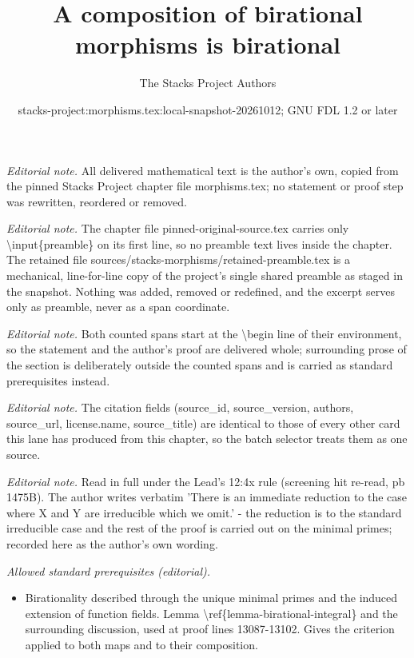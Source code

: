 \documentclass[10pt,a4paper]{amsart}
\title{A composition of birational morphisms is birational}
\author{The Stacks Project Authors}
\date{stacks-project:morphisms.tex:local-snapshot-20261012; GNU FDL 1.2 or later}
\theoremstyle{plain}
\theoremstyle{definition}
\theoremstyle{remark}
\numberwithin{equation}{subsection}
\begin{document}
\maketitle
\setcounter{subsection}{1}
\noindent\textit{Editorial note.} All delivered mathematical text is the author's own, copied from the pinned Stacks Project chapter file morphisms.tex; no statement or proof step was rewritten, reordered or removed.\par\medskip
\noindent\textit{Editorial note.} The chapter file pinned-original-source.tex carries only \textbackslash{}input\{preamble\} on its first line, so no preamble text lives inside the chapter. The retained file sources/stacks-morphisms/retained-preamble.tex is a mechanical, line-for-line copy of the project's single shared preamble as staged in the snapshot. Nothing was added, removed or redefined, and the excerpt serves only as preamble, never as a span coordinate.\par\medskip
\noindent\textit{Editorial note.} Both counted spans start at the \textbackslash{}begin line of their environment, so the statement and the author's proof are delivered whole; surrounding prose of the section is deliberately outside the counted spans and is carried as standard prerequisites instead.\par\medskip
\noindent\textit{Editorial note.} The citation fields (source\_id, source\_version, authors, source\_url, license.name, source\_title) are identical to those of every other card this lane has produced from this chapter, so the batch selector treats them as one source.\par\medskip
\noindent\textit{Editorial note.} Read in full under the Lead's 12:4x rule (screening hit re-read, pb 1475B). The author writes verbatim 'There is an immediate reduction to the case where X and Y are irreducible which we omit.' - the reduction is to the standard irreducible case and the rest of the proof is carried out on the minimal primes; recorded here as the author's own wording.\par\medskip
\noindent\textit{Allowed standard prerequisites (editorial).}\begin{itemize}
\item Birationality described through the unique minimal primes and the induced extension of function fields. Lemma \textbackslash{}ref\{lemma-birational-integral\} and the surrounding discussion, used at proof lines 13087-13102. Gives the criterion applied to both maps and to their composition.
\end{itemize}\medskip
\end{document}

